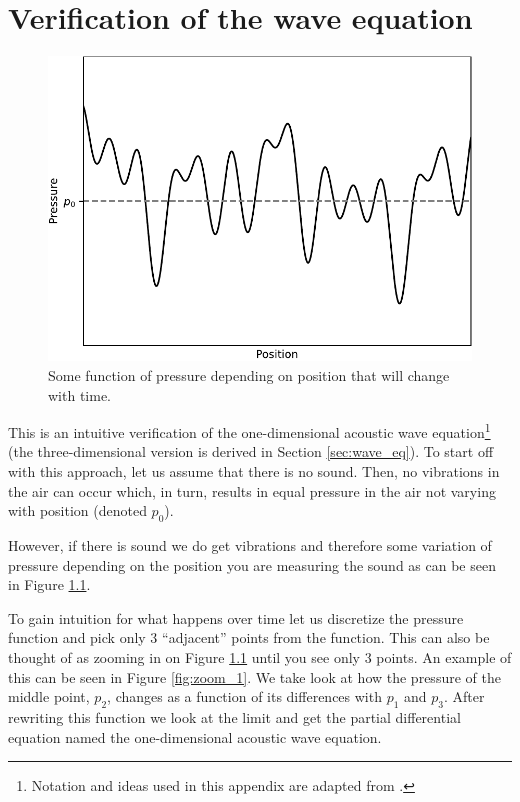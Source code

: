 \chapter{Verification of the wave equation}
\label{appendix:wave_eq}

\begin{figure}
    \vspace{-12pt}
    \centering
    \includegraphics[width=.4\textwidth]{pictures/random_pressure}
    \vspace{-1.5em}
    \caption{Some function of pressure depending on position that will change with time.}
    \label{fig:pres_pos}
    \vspace{-1.5em}
\end{figure}

This is an intuitive verification of the one-dimensional acoustic wave equation\footnote{Notation and ideas used in this appendix are adapted from \citeauthor{notation_intuitive} \cite{notation_intuitive}.} (the three-dimensional version is derived in Section \ref{sec:wave_eq}).
To start off with this approach, let us assume that there is no sound.
Then, no vibrations in the air can occur which, in turn, results in equal pressure in the air not varying with position (denoted $p_0$).

However, if there is sound we do get vibrations and therefore some variation of pressure depending on the position you are measuring the sound as can be seen in Figure \ref{fig:pres_pos}.

To gain intuition for what happens over time let us discretize the pressure function and pick only 3 ``adjacent'' points from the function.
This can also be thought of as zooming in on Figure \ref{fig:pres_pos} until you see only 3 points.
An example of this can be seen in Figure \ref{fig:zoom_1}.
We take look at how the pressure of the middle point, $p_2$, changes as a function of its differences with $p_1$ and $p_3$. After rewriting this function we look at the limit and get the partial differential equation named the one-dimensional acoustic wave equation.

